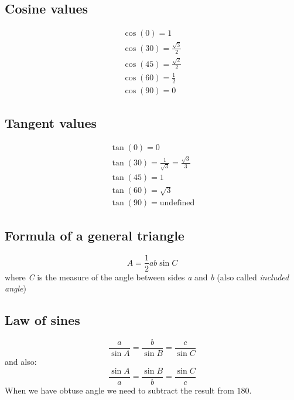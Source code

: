 \documentclass{article}
\begin{document}
\subsection{Cosine values}
\begin{equation}
  \begin{gathered}
    \cos(0) = 1 \\
    \cos(30) = \frac{\sqrt{3}}{2} \\
    \cos(45) = \frac{\sqrt{2}}{2} \\
    \cos(60) = \frac{1}{2} \\
    \cos(90) = 0
  \end{gathered}
\end{equation}


\subsection{Tangent values}
\begin{equation}
  \begin{gathered}
    \tan(0) = 0 \\
    \tan(30) = \frac{1}{\sqrt{3}} = \frac{\sqrt{3}}{3} \\
    \tan(45) = 1 \\
    \tan(60) = \sqrt{3} \\
    \tan(90) = \text{undefined}
  \end{gathered}
\end{equation}

\subsection{Formula of a general triangle}

\begin{equation}
  A = \frac{1}{2}ab \sin{C}
\end{equation}
where \textit{C} is the measure of the angle between sides \textit{a} and \textit{b} (also called \textit{included angle})

\subsection{Law of sines}

\begin{equation}
  \frac{a}{\sin A} = \frac{b}{\sin B} = \frac{c}{\sin C}
\end{equation}
and also:
\begin{equation}
  \frac{\sin A}{a} = \frac{\sin B}{b} = \frac{\sin C}{c}
\end{equation}
When we have obtuse angle we need to subtract the result from $180$.
\end{document}
